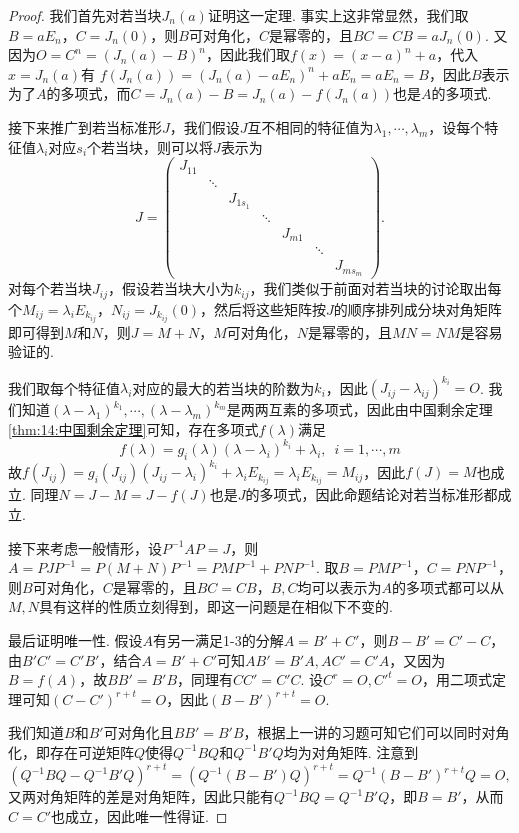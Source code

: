 \begin{proof}
    我们首先对若当块$J_n(a)$证明这一定理. 事实上这非常显然，我们取$B=aE_n$，$C=J_n(0)$，则$B$可对角化，$C$是幂零的，且$BC=CB=aJ_n(0)$. 又因为$O=C^n=(J_n(a)-B)^n$，因此我们取$f(x)=(x-a)^n+a$，代入$x=J_n(a)$有
    $f(J_n(a))=(J_n(a)-aE_n)^n+aE_n=aE_n=B$，因此$B$表示为了$A$的多项式，而$C=J_n(a)-B=J_n(a)-f(J_n(a))$也是$A$的多项式.

    接下来推广到若当标准形$J$，我们假设$J$互不相同的特征值为$\lambda_1,\cdots,\lambda_m$，设每个特征值$\lambda_i$对应$s_i$个若当块，则可以将$J$表示为
    \[J=\begin{pmatrix}
        J_{11} & & & & & & \\
        & \ddots & & & & & \\
        & & J_{1s_1} & & & & \\
        & & & \ddots & & & \\
        & & & & J_{m1} & & \\
        & & & & & \ddots & \\
        & & & & & & J_{ms_m}
    \end{pmatrix}.\]
    对每个若当块$J_{ij}$，假设若当块大小为$k_{ij}$，我们类似于前面对若当块的讨论取出每个$M_{ij}=\lambda_i E_{k_{ij}}$，$N_{ij}=J_{k_{ij}}(0)$，然后将这些矩阵按$J$的顺序排列成分块对角矩阵即可得到$M$和$N$，则$J=M+N$，$M$可对角化，$N$是幂零的，且$MN=NM$是容易验证的.

   我们取每个特征值$\lambda_i$对应的最大的若当块的阶数为$k_i$，因此$(J_{ij}-\lambda_{ij})^{k_i}=O$. 我们知道$(\lambda-\lambda_1)^{k_1},\cdots,(\lambda-\lambda_m)^{k_m}$是两两互素的多项式，因此由中国剩余定理\autoref{thm:14:中国剩余定理}可知，存在多项式$f(\lambda)$满足
   \[f(\lambda)=g_i(\lambda)(\lambda-\lambda_i)^{k_i}+\lambda_i,\enspace i=1,\cdots,m\]
    故$f(J_{ij})=g_i(J_{ij})(J_{ij}-\lambda_i)^{k_i}+\lambda_iE_{k_{ij}}=\lambda_iE_{k_{ij}}=M_{ij}$，因此$f(J)=M$也成立. 同理$N=J-M=J-f(J)$也是$J$的多项式，因此命题结论对若当标准形都成立.

    接下来考虑一般情形，设$P^{-1}AP=J$，则$A=PJP^{-1}=P(M+N)P^{-1}=PMP^{-1}+PNP^{-1}$. 取$B=PMP^{-1}$，$C=PNP^{-1}$，则$B$可对角化，$C$是幂零的，且$BC=CB$，$B,C$均可以表示为$A$的多项式都可以从$M,N$具有这样的性质立刻得到，即这一问题是在相似下不变的.

    最后证明唯一性. 假设$A$有另一满足1-3的分解$A=B'+C'$，则$B-B'=C'-C$，由$B'C'=C'B'$，结合$A=B'+C'$可知$AB'=B'A,AC'=C'A$，又因为$B=f(A)$，故$BB'=B'B$，同理有$CC'=C'C$. 设$C^r=O,C'^t=O$，用二项式定理可知$(C-C')^{r+t}=O$，因此$(B-B')^{r+t}=O$.

    我们知道$B$和$B'$可对角化且$BB'=B'B$，根据上一讲的习题可知它们可以同时对角化，即存在可逆矩阵$Q$使得$Q^{-1}BQ$和$Q^{-1}B'Q$均为对角矩阵. 注意到
    \[(Q^{-1}BQ-Q^{-1}B'Q)^{r+t}=(Q^{-1}(B-B')Q)^{r+t}=Q^{-1}(B-B')^{r+t}Q=O,\]
    又两对角矩阵的差是对角矩阵，因此只能有$Q^{-1}BQ=Q^{-1}B'Q$，即$B=B'$，从而$C=C'$也成立，因此唯一性得证.
\end{proof}

